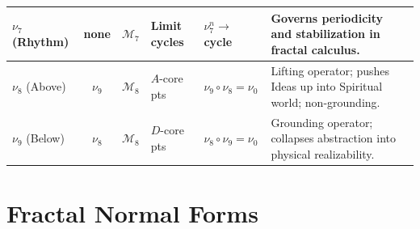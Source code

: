 \begin{longtable}{p{1.3cm}|c|p{1.5cm}|p{1.8cm}|p{2cm}|p{4.5cm}}
$\nu_7$ (Rhythm)
& none
& $\mathcal{M}_7$
& Limit cycles
& $\nu_7^n \to$ cycle
& Governs periodicity and stabilization in fractal calculus.
\\
\midrule

$\nu_8$ (Above)
& $\nu_9$
& $\mathcal{M}_8$
& $A$-core pts
& $\nu_9 \circ \nu_8 = \nu_0$
& Lifting operator; pushes Ideas up into Spiritual world; non-grounding.
\\
\midrule

$\nu_9$ (Below)
& $\nu_8$
& $\mathcal{M}_8$
& $D$-core pts
& $\nu_8 \circ \nu_9 = \nu_0$
& Grounding operator; collapses abstraction into physical realizability.
\\

\end{longtable}
\normalsize

\section{Fractal Normal Forms}

